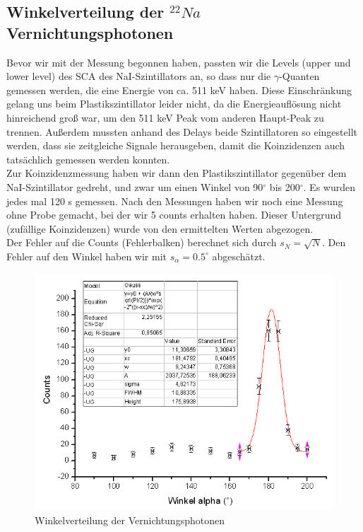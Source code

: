 \subsection{Winkelverteilung der $^{22}Na$ Vernichtungsphotonen}

Bevor wir mit der Messung begonnen haben, passten wir die Levels (upper und lower level) des SCA des NaI-Szintillators an, so dass nur die $\gamma$-Quanten gemessen werden, die eine Energie von ca. 511 keV haben. Diese Einschränkung gelang uns beim Plastikszintillator leider nicht, da die Energieauflösung nicht hinreichend groß war, um den 511 keV Peak vom anderen Haupt-Peak zu trennen. Außerdem mussten anhand des Delays beide Szintillatoren so eingestellt werden, dass sie zeitgleiche Signale herausgeben, damit die Koinzidenzen auch tatsächlich gemessen werden konnten.\\

Zur Koinzidenzmessung haben wir dann den Plastikszintillator gegenüber dem NaI-Szintillator gedreht, und zwar um einen Winkel von 90$^\circ$ bis 200$^\circ$. Es wurden jedes mal 120 s gemessen. Nach den Messungen haben wir noch eine Messung ohne Probe gemacht, bei der wir 5 counts erhalten haben. Dieser Untergrund (zufällige Koinzidenzen) wurde von den ermittelten Werten abgezogen.\\

Der Fehler auf die Counts (Fehlerbalken) berechnet sich durch $s_N = \sqrt{N}$. Den Fehler auf den Winkel haben wir mit $s_\alpha = 0.5^\circ$ abgeschätzt.

\begin{figure}[H]
\centering \includegraphics[width = \textwidth]{auswertung/Winkel.png}
\caption{Winkelverteilung der Vernichtungsphotonen}
\end{figure}

